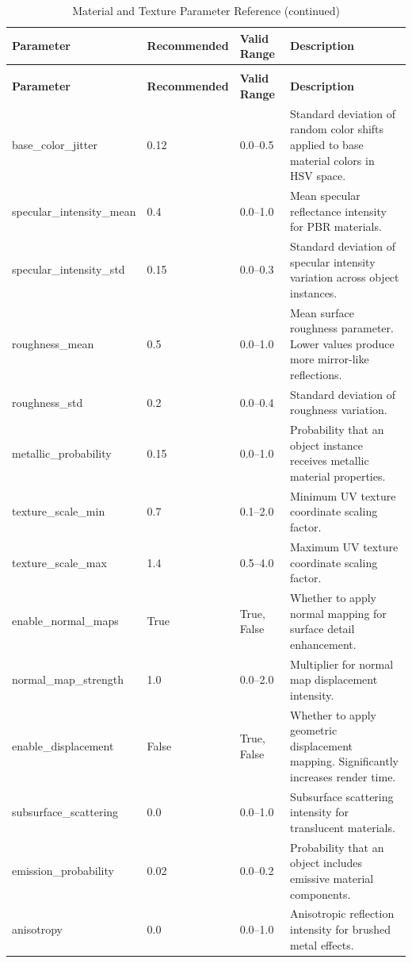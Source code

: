 \begin{longtable}{p{3.5cm}p{2cm}p{2.5cm}p{5.5cm}}
\caption{Material and Texture Parameter Reference} \label{tab:materials} \\
\toprule
\textbf{Parameter} & \textbf{Recommended} & \textbf{Valid Range} & \textbf{Description} \\
\midrule
\endfirsthead
\caption[]{Material and Texture Parameter Reference (continued)} \\
\toprule
\textbf{Parameter} & \textbf{Recommended} & \textbf{Valid Range} & \textbf{Description} \\
\midrule
\endhead
\bottomrule
\endfoot
\bottomrule
\endlastfoot
base\_color\_jitter & 0.12 & 0.0--0.5 & Standard deviation of random color shifts applied to base material colors in HSV space. \\
\addlinespace
specular\_intensity\_mean & 0.4 & 0.0--1.0 & Mean specular reflectance intensity for PBR materials. \\
\addlinespace
specular\_intensity\_std & 0.15 & 0.0--0.3 & Standard deviation of specular intensity variation across object instances. \\
\addlinespace
roughness\_mean & 0.5 & 0.0--1.0 & Mean surface roughness parameter. Lower values produce more mirror-like reflections. \\
\addlinespace
roughness\_std & 0.2 & 0.0--0.4 & Standard deviation of roughness variation. \\
\addlinespace
metallic\_probability & 0.15 & 0.0--1.0 & Probability that an object instance receives metallic material properties. \\
\addlinespace
texture\_scale\_min & 0.7 & 0.1--2.0 & Minimum UV texture coordinate scaling factor. \\
\addlinespace
texture\_scale\_max & 1.4 & 0.5--4.0 & Maximum UV texture coordinate scaling factor. \\
\addlinespace
enable\_normal\_maps & True & True, False & Whether to apply normal mapping for surface detail enhancement. \\
\addlinespace
normal\_map\_strength & 1.0 & 0.0--2.0 & Multiplier for normal map displacement intensity. \\
\addlinespace
enable\_displacement & False & True, False & Whether to apply geometric displacement mapping. Significantly increases render time. \\
\addlinespace
subsurface\_scattering & 0.0 & 0.0--1.0 & Subsurface scattering intensity for translucent materials. \\
\addlinespace
emission\_probability & 0.02 & 0.0--0.2 & Probability that an object includes emissive material components. \\
\addlinespace
anisotropy & 0.0 & 0.0--1.0 & Anisotropic reflection intensity for brushed metal effects. \\
\end{longtable}

